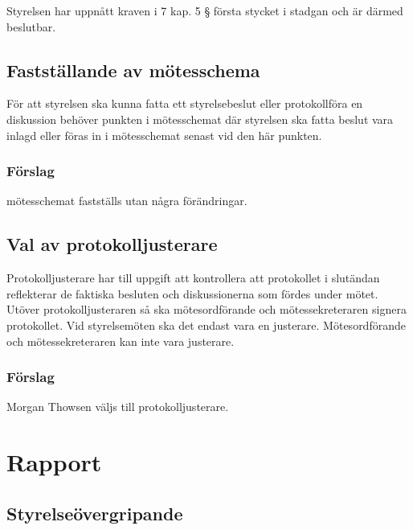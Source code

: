 \documentclass[protokoll]{dvd}
\begin{document}
\begin{attsatser}
    \item Styrelsen har uppnått kraven i 7 kap. 5 § första stycket i stadgan och är därmed beslutbar.
\end{attsatser}

\subsection{Fastställande av mötesschema}

För att styrelsen ska kunna fatta ett styrelsebeslut eller protokollföra en diskussion behöver punkten i mötesschemat där styrelsen ska fatta beslut vara inlagd eller föras in i mötesschemat senast vid den här punkten.

\subsubsection*{Förslag}

\begin{attsatser}
    \item mötesschemat fastställs utan några förändringar.
\end{attsatser}

\subsection{Val av protokolljusterare}

Protokolljusterare har till uppgift att kontrollera att protokollet i slutändan reflekterar de faktiska besluten och diskussionerna som fördes under mötet.
Utöver protokolljusteraren så ska mötesordförande och mötessekreteraren signera protokollet.
Vid styrelsemöten ska det endast vara en justerare.
Mötesordförande och mötessekreteraren kan inte vara justerare.

\subsubsection*{Förslag}
\begin{attsatser}
    \item Morgan Thowsen väljs till protokolljusterare.
\end{attsatser}

\section{Rapport}

\subsection{Styrelseövergripande}
\end{document}
